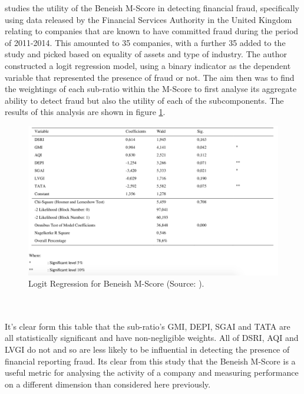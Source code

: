 {\cite{herawatiBeneish} studies the utility of the Beneish M-Score in detecting financial fraud, specifically using data released by the Financial Services Authority in the United Kingdom relating to companies that are known to have committed fraud during the period of 2011-2014. This amounted to 35 companies, with a further 35 added to the study and picked based on equality of assets and type of industry. The author constructed a logit regression model, using a binary indicator as the dependent variable that represented the presence of fraud or not. The aim then was to find the weightings of each sub-ratio within the M-Score to first analyse its aggregate ability to detect fraud but also the utility of each of the subcomponents. The results of this analysis are shown in figure \ref{beneish_comp}. 
\begin{figure}[h] \label{logitBeneish}
\centering
\includegraphics[scale = 0.7, angle =90]{images/litReview/beneish_comp.png}
\caption{Logit Regression for Beneish M-Score (Source: \cite{herawatiBeneish}).}
\label{beneish_comp}
\end{figure}\\\\
It's clear form this table that the sub-ratio's GMI, DEPI, SGAI and TATA are all statistically significant and have non-negligible weights. All of DSRI, AQI and LVGI do not and so are less likely to be influential in detecting the presence of financial reporting fraud. Its clear from this study that the Beneish M-Score is a useful metric for analysing the activity of a company and measuring performance on a different dimension than considered here previously.  }\\\\
\clearpage
